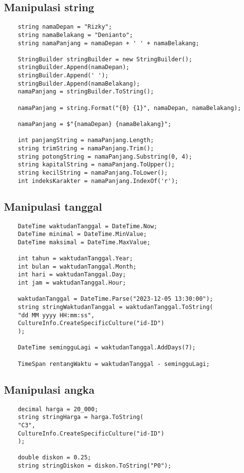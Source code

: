\documentclass{book}
\begin{document}
	\subsection{Manipulasi string}
	\begin{lstlisting}
	string namaDepan = "Rizky";
	string namaBelakang = "Denianto";
	string namaPanjang = namaDepan + ' ' + namaBelakang;
	
	StringBuilder stringBuilder = new StringBuilder();
	stringBuilder.Append(namaDepan);
	stringBuilder.Append(' ');
	stringBuilder.Append(namaBelakang);
	namaPanjang = stringBuilder.ToString();
	
	namaPanjang = string.Format("{0} {1}", namaDepan, namaBelakang);
	
	namaPanjang = $"{namaDepan} {namaBelakang}";
	
	int panjangString = namaPanjang.Length;
	string trimString = namaPanjang.Trim();
	string potongString = namaPanjang.Substring(0, 4);
	string kapitalString = namaPanjang.ToUpper();
	string kecilString = namaPanjang.ToLower();
	int indeksKarakter = namaPanjang.IndexOf('r');
	\end{lstlisting}
	
	\subsection{Manipulasi tanggal}
	\begin{lstlisting}
	DateTime waktudanTanggal = DateTime.Now;
	DateTime minimal = DateTime.MinValue;
	DateTime maksimal = DateTime.MaxValue;
	
	int tahun = waktudanTanggal.Year;
	int bulan = waktudanTanggal.Month;
	int hari = waktudanTanggal.Day;
	int jam = waktudanTanggal.Hour;
	
	waktudanTanggal = DateTime.Parse("2023-12-05 13:30:00");
	string stringWaktudanTanggal = waktudanTanggal.ToString(
	"dd MM yyyy HH:mm:ss",
	CultureInfo.CreateSpecificCulture("id-ID")
	);
	
	DateTime semingguLagi = waktudanTanggal.AddDays(7);
	
	TimeSpan rentangWaktu = waktudanTanggal - semingguLagi;
	\end{lstlisting}
	
	\subsection{Manipulasi angka}
	\begin{lstlisting}
	decimal harga = 20_000;
	string stringHarga = harga.ToString(
	"C3",
	CultureInfo.CreateSpecificCulture("id-ID")
	);
	
	double diskon = 0.25;
	string stringDiskon = diskon.ToString("P0");
	\end{lstlisting}
	
\end{document}
